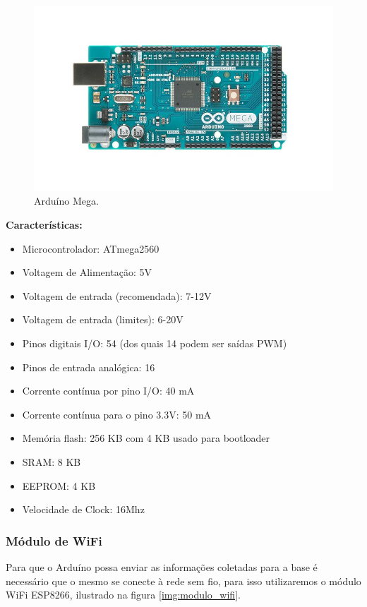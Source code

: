     \begin{figure}[H]                                                  
      \centering                                                       
      \includegraphics[scale=0.4]{figuras/arduino_mega.png} 
      \caption{Arduíno Mega.}                  
      \label{img:arduino_mega}                                             
    \end{figure}                                                       

 	\textbf{Características:}
    \begin{itemize}
      \item Microcontrolador: ATmega2560
      \item Voltagem de Alimentação: 5V
      \item Voltagem de entrada (recomendada): 7-12V
      \item Voltagem de entrada (limites): 6-20V
      \item Pinos digitais I/O: 54 (dos quais 14 podem ser saídas PWM)
      \item Pinos de entrada analógica: 16
      \item Corrente contínua por pino I/O: 40 mA
      \item Corrente contínua para o pino 3.3V: 50 mA
      \item Memória flash: 256 KB com 4 KB usado para bootloader
      \item SRAM: 8 KB
      \item EEPROM: 4 KB
      \item Velocidade de Clock: 16Mhz
    \end{itemize}
  
  \subsubsection{Módulo de WiFi}
  \label{sub:Modulo_de_wifi}
    Para que o Arduíno possa enviar as informações coletadas para a base é necessário que o mesmo se conecte à rede sem fio, para isso utilizaremos o módulo WiFi ESP8266, ilustrado na figura \ref{img:modulo_wifi}.

